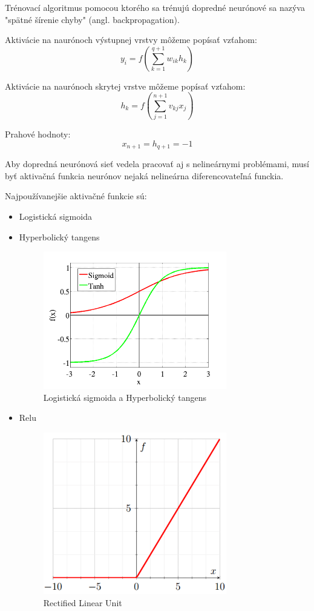 Trénovací algoritmus pomocou ktorého sa trénujú dopredné neurónové sa nazýva "spätné šírenie chyby" (angl. backpropagation).

Aktivácie na naurónoch výstupnej vrstvy môžeme popísať vzťahom:
\begin{equation}
y_i = f(\sum_{k=1}^{q+1}w_{ik}h_{k})
\end{equation}

Aktivácie na naurónoch skrytej vrstve môžeme popísať vzťahom:
\begin{equation}
	h_{k} = f(\sum_{j=1}^{n+1}v_{kj}x_{j})
\end{equation}

Prahové hodnoty:
\begin{equation}
	x_{n+1} = h_{q+1} = -1
\end{equation}

Aby dopredná neurónová sieť vedela pracovať aj s nelineárnymi problémami, musí byť aktivačná funkcia neurónov
nejaká nelineárna diferencovateľná funckia. 

Najpoužívanejšie aktivačné funkcie sú:

\begin{itemize}
	\item Logistická sigmoida
	\item Hyperbolický tangens
	
	\begin{figure}[H]
		\centering
		\includegraphics[width=8cm]{assets/activation_functions}
		\caption{Logistická sigmoida a Hyperbolický tangens}
	\end{figure}
	\item Relu
	\begin{figure}[H]
		\centering
		\includegraphics[width=8cm]{assets/relu}
		\caption{Rectified Linear Unit}
	\end{figure}
\end{itemize}

